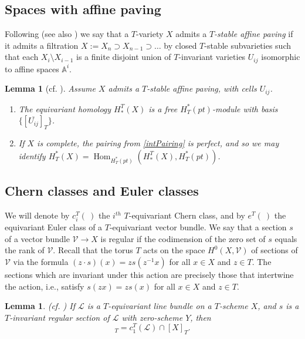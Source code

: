 \documentclass[10pt]{article}
\numberwithin{thm}{section}
\newtheorem{lemma}[thm]{Lemma}
\theoremstyle{definition}
\theoremstyle{remark}
\newcommand{\Hom}{\operatorname{Hom}}
\begin{document}
\subsection{Spaces with affine paving}
Following \cite[Ex~1.9.1]{fulton:IT} (see also \cite{graham:positivity}) we say that 
a $T$-variety $X$ admits a {\em $T$-stable affine paving}
if it admits a filtration $X:=X_n \supset X_{n-1} \supset \ldots$ by closed $T$-stable subvarieties
such that each $X_i \setminus X_{i-1}$ is a finite disjoint union
of $T$-invariant varieties $U_{ij}$ isomorphic to affine spaces $\mathbb A^i$. 

\begin{lemma}[cf. \cite{graham:positivity}] 
\label{lemma:generate} Assume $X$ admits a $T$-stable affine paving, with cells $U_{ij}$. 
\begin{enumerate}[label=(\alph*)]
\item
The equivariant homology $H_*^T(X)$ is a free $H^*_T(pt)$-module with 
basis $\{[\overline{U_{ij}}]_T\}$.
\item
If $X$ is complete, the pairing from \cref{intPairing} is perfect, 
and so we may identify
$H^*_T(X) = \Hom_{H^*_T(pt)}(H_*^T(X), H^*_T(pt))$.
\end{enumerate}
\end{lemma}

\subsection{Chern classes and Euler classes}
\label{sec:eulerClass}
We will denote by $c_i^T(\ )$ the $i^{th}$ $T$-equivariant Chern class,
and by $e^T(\ )$ the equivariant Euler class of a $T$-equivariant vector bundle.
We say that a section $s$ of a vector bundle $\mathcal V\to X$ is regular if the codimension of the zero set of $s$ equals the rank of $\mathcal V$.
Recall that the torus $T$ acts on the space $H^0(X,\mathcal V)$ of sections of $\mathcal V$ via the formula $(z\cdot s)(x) = zs(z^{-1}x)$ for all $x\in X$ and $z\in T$.
The sections which are invariant under this action are precisely those that intertwine the action,
i.e., satisfy $s(zx)=zs(x)$ for all $x\in X$ and $z\in T$.

\begin{lemma}{\rm (cf. \cite[Lemma 2.2]{graham2020cominuscule})}
\label{lem:eqSec}
If $\mathcal L$ is a $T$-equivariant line bundle on a $T$-scheme $X$,
and $s$ is a $T$-invariant regular section of $\mathcal L$ with zero-scheme $Y$,
then 
\begin{equation*}
[Y]_T=c_1^T(\mathcal L)\cap[X]_T.
\end{equation*}
\end{lemma}
\end{document}
